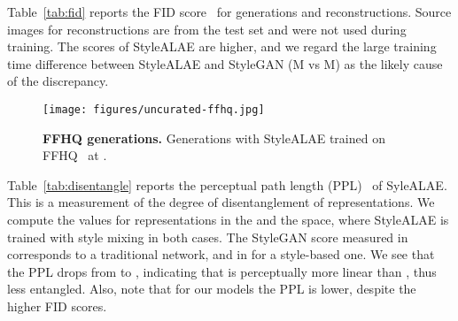 \begin{table}[b!]
\vspace{-4mm}
  \centering
  \caption{Comparison of FID and PPL scores for CelebA-HQ images at  (lower is better). FID is based on 50,000 generated samples compared to training samples.}
    \label{t-celeba}
\end{table}


Table~\ref{tab:fid} reports the FID score~\cite{heusel2017gans} for generations and reconstructions. Source images for reconstructions are from the test set and were not used during training. The scores of StyleALAE are higher, and we regard the large training time difference between StyleALAE and StyleGAN (M vs M) as the likely cause of the  discrepancy.
\begin{figure}[t!]
\begin{center}
\texttt{[image: figures/uncurated-ffhq.jpg]}
\end{center}
\vspace{-4mm}
\caption{\textbf{FFHQ generations.} Generations with StyleALAE trained on FFHQ~\cite{Karras2019} at .}
\vspace{-1mm}
\label{fig:genffhq}
\end{figure}

Table~\ref{tab:disentangle} reports the perceptual path length (PPL)~\cite{Karras2019} of SyleALAE. This is a measurement of the degree of disentanglement of representations. We compute the values for representations in the  and the  space, where StyleALAE is trained with style mixing in both cases. The StyleGAN score measured in  corresponds to a traditional network, and in  for a style-based one. We see that the PPL drops from  to , indicating that   is perceptually more linear than , thus less entangled. Also, note that for our models the PPL is lower, despite the higher FID scores.

